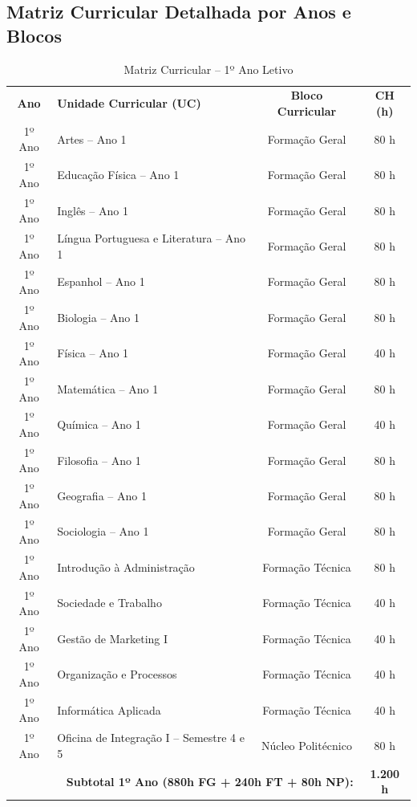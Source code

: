 
\subsection{Matriz Curricular Detalhada por Anos e Blocos}

\begin{table}[H]
\centering
\small
\begin{tabularx}{\linewidth}{|c|X|c|c|}
\hline
\rowcolor{ifscgreen!20}
\multicolumn{4}{|c|}{\textbf{\large 1º ANO LETIVO (SEMESTRES 1 E 2)}} \\ \hline
\rowcolor{cinzaTabela}
\textbf{Ano} & \textbf{Unidade Curricular (UC)} & \textbf{Bloco Curricular} & \textbf{CH (h)} \\ \hline
1º Ano & Artes -- Ano 1 & Formação Geral & 80 h \\ \hline
1º Ano & Educação Física -- Ano 1 & Formação Geral & 80 h \\ \hline
1º Ano & Inglês -- Ano 1 & Formação Geral & 80 h \\ \hline
1º Ano & Língua Portuguesa e Literatura -- Ano 1 & Formação Geral & 80 h \\ \hline
1º Ano & Espanhol -- Ano 1 & Formação Geral & 80 h \\ \hline
1º Ano & Biologia -- Ano 1 & Formação Geral & 80 h \\ \hline
1º Ano & Física -- Ano 1 & Formação Geral & 40 h \\ \hline
1º Ano & Matemática -- Ano 1 & Formação Geral & 80 h \\ \hline
1º Ano & Química -- Ano 1 & Formação Geral & 40 h \\ \hline
1º Ano & Filosofia -- Ano 1 & Formação Geral & 80 h \\ \hline
1º Ano & Geografia -- Ano 1 & Formação Geral & 80 h \\ \hline
1º Ano & Sociologia -- Ano 1 & Formação Geral & 80 h \\ \hline
1º Ano & Introdução à Administração & Formação Técnica & 80 h \\ \hline
1º Ano & Sociedade e Trabalho & Formação Técnica & 40 h \\ \hline
1º Ano & Gestão de Marketing I & Formação Técnica & 40 h \\ \hline
1º Ano & Organização e Processos & Formação Técnica & 40 h \\ \hline
1º Ano & Informática Aplicada & Formação Técnica & 40 h \\ \hline
1º Ano & Oficina de Integração I -- Semestre 4 e 5 & Núcleo Politécnico & 80 h \\ \hline
\multicolumn{3}{|r|}{\textbf{Subtotal 1º Ano (880h FG + 240h FT + 80h NP):}} & \textbf{1.200 h} \\ \hline
\end{tabularx}
\caption{Matriz Curricular -- 1º Ano Letivo}
\end{table}

